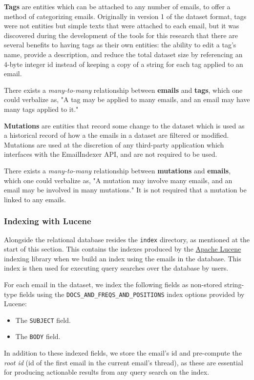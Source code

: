 \documentclass[a4paper, 12pt]{article}
\begin{document}
			\textbf{Tags} are entities which can be attached to any number of emails, to offer a method of categorizing emails. Originally in version 1 of the dataset format, tags were not entities but simple texts that were attached to each email, but it was discovered during the development of the tools for this research that there are several benefits to having tags as their own entities: the ability to edit a tag's name, provide a description, and reduce the total dataset size by referencing an 4-byte integer id instead of keeping a copy of a string for each tag applied to an email.
			
			There exists a \textit{many-to-many} relationship between \textbf{emails} and \textbf{tags}, which one could verbalize as, "A tag may be applied to many emails, and an email may have many tags applied to it."
			
			\textbf{Mutations} are entities that record some change to the dataset which is used as a historical record of how a the emails in a dataset are filtered or modified. Mutations are used at the discretion of any third-party application which interfaces with the EmailIndexer API, and are not required to be used.
			
			There exists a \textit{many-to-many} relationship between \textbf{mutations} and \textbf{emails}, which one could verbalize as, "A mutation may involve many emails, and an email may be involved in many mutations." It is not required that a mutation be linked to any emails.
			
		\subsubsection{Indexing with Lucene}
			Alongside the relational database resides the \texttt{index} directory, as mentioned at the start of this section. This contains the indexes produced by the \href{https://lucene.apache.org/}{Apache Lucene} indexing library when we build an index using the emails in the database. This index is then used for executing query searches over the database by users.
			
			For each email in the dataset, we index the following fields as non-stored string-type fields using the \texttt{DOCS\_AND\_FREQS\_AND\_POSITIONS} index options provided by Lucene\autocite{apache-lucene}:
			\begin{itemize}
				\item The \texttt{SUBJECT} field.
				\item The \texttt{BODY} field.
			\end{itemize}
			In addition to these indexed fields, we store the email's id and pre-compute the \textit{root id} (id of the first email in the current email's thread), as these are essential for producing actionable results from any query search on the index.
			
\end{document}
